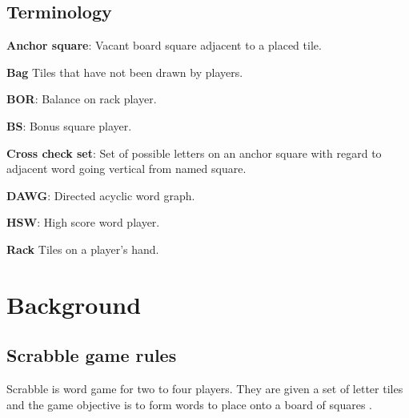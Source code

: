 \documentclass[a4paper, 12pt]{report}
\begin{document}
\section {Terminology}
\label{sec:terminology}

\begin{description}
\item{\bf{Anchor square}}: Vacant board square adjacent to a placed tile.

\item{\bf{Bag}} Tiles that have not been drawn by players.

\item{\bf{BOR}}: Balance on rack player.

\item{\bf{BS}}: Bonus square player.

\item{\bf{Cross check set}}: Set of possible letters on an anchor square with regard to adjacent word going vertical from named square.

\item{\bf{DAWG}}: Directed acyclic word graph.

\item{\bf{HSW}}: High score word player.

\item{\bf{Rack}} Tiles on a player's hand. 

\end{description}







\chapter{Background}

\section{Scrabble game rules}
Scrabble is word game for two to four players. They are given a set of letter tiles and the game objective is to form words to place onto a board of squares \cite{ABSP} \cite{NASPA} \cite{forbund}.
\end{document}
